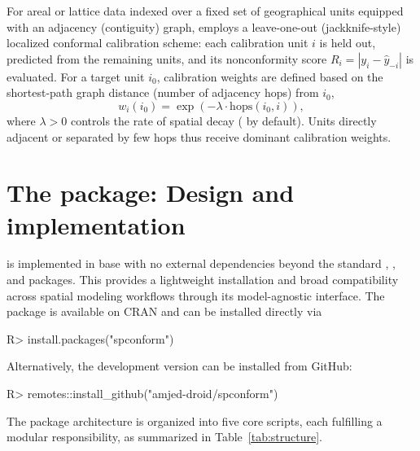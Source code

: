 \documentclass[article]{jss}
\begin{document}
For areal or lattice data indexed over a fixed set of geographical units equipped with an adjacency (contiguity) graph,  employs a leave-one-out (jackknife-style) localized conformal calibration scheme: each calibration unit $i$ is held out, predicted from the remaining units, and its nonconformity score $R_i = |y_i - \hat{y}_{-i}|$ is evaluated. For a target unit $i_0$, calibration weights are defined based on the shortest-path graph distance (number of adjacency hops) from $i_0$,
%
\begin{equation} \label{eq:graph_weights}
w_i(i_0) = \exp(-\lambda \cdot \mathrm{hops}(i_0, i)),
\end{equation}
%
where $\lambda > 0$ controls the rate of spatial decay ( by default). Units directly adjacent or separated by few hops thus receive dominant calibration weights.



\section[The spconform package: Design and implementation]{The  package: Design and implementation}\label{sec:software}

 is implemented in base  with no external dependencies beyond the standard , , and  packages. This provides a lightweight installation and broad compatibility across spatial modeling workflows through its model-agnostic  interface. The package is available on CRAN and can be installed directly via
%
\begin{Code}
R> install.packages("spconform")
\end{Code}
%
Alternatively, the development version can be installed from GitHub:
%
\begin{Code}
R> remotes::install_github("amjed-droid/spconform")
\end{Code}
%
The package architecture is organized into five core  scripts, each fulfilling a modular responsibility, as summarized in Table~\ref{tab:structure}.
\end{document}
